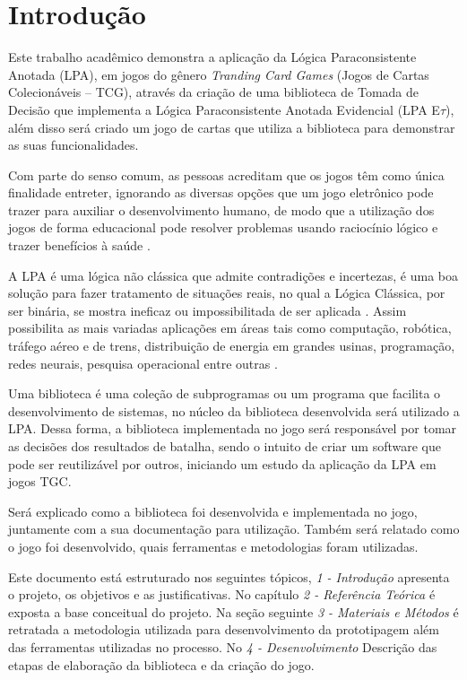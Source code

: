 
\chapter{Introdução}

Este trabalho acadêmico demonstra a aplicação da Lógica Paraconsistente Anotada (LPA), em jogos do gênero \textit{Tranding Card Games} (Jogos de Cartas Colecionáveis – TCG), através da criação de uma biblioteca de Tomada de Decisão que implementa a Lógica Paraconsistente Anotada Evidencial (LPA E$\tau$), além disso será criado um jogo de cartas que utiliza a biblioteca para demonstrar as suas funcionalidades.

Com parte do senso comum, as pessoas acreditam que os jogos têm como única finalidade entreter, ignorando as diversas opções que um jogo eletrônico pode trazer para auxiliar o desenvolvimento humano, de modo que a utilização dos jogos de forma educacional pode resolver problemas usando raciocínio lógico e trazer benefícios à saúde \cite{fabio-luis-lpa}.

A LPA é uma lógica não clássica que admite contradições e incertezas, é uma boa solução para fazer tratamento de situações reais, no qual a Lógica Clássica, por ser binária, se mostra ineficaz ou impossibilitada de ser aplicada \cite{metodos-lpa-2006}. Assim possibilita as mais variadas aplicações em áreas tais como computação, robótica, tráfego aéreo e de trens, distribuição de energia em grandes usinas, programação, redes neurais, pesquisa operacional entre outras \cite{tomda-decisao-lpa-2011}.

Uma biblioteca é uma coleção de subprogramas ou um programa que facilita o desenvolvimento de sistemas, no núcleo da biblioteca desenvolvida será utilizado a
LPA. Dessa forma, a biblioteca implementada no jogo será responsável por tomar as decisões dos resultados de batalha, sendo o intuito de criar um software que pode ser reutilizável por outros, iniciando um estudo da aplicação da LPA em jogos TGC.

Será explicado como a biblioteca foi desenvolvida e implementada no jogo, juntamente com a sua documentação para utilização. Também será relatado como o
jogo foi desenvolvido, quais ferramentas e metodologias foram utilizadas.

Este documento está estruturado nos seguintes tópicos, \textit{1 - Introdução} apresenta o projeto, os objetivos e as justificativas. No capítulo \textit{2 - Referência Teórica} é
exposta a base conceitual do projeto. Na seção seguinte \textit{3 - Materiais e Métodos} é retratada a metodologia utilizada para desenvolvimento da prototipagem além das ferramentas utilizadas no processo. No \textit{4 - Desenvolvimento} Descrição das etapas de elaboração da biblioteca e da criação do jogo. 

